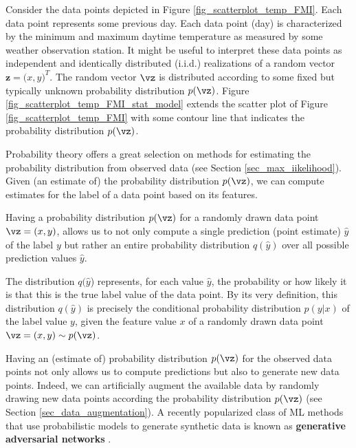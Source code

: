 \documentclass[12pt]{report}
\begin{document}
Consider the data points depicted in Figure \ref{fig_scatterplot_temp_FMI}. 
Each data point represents some previous day. Each data point (day) 
is characterized by the minimum and maximum daytime temperature 
as measured by some weather observation station. It might 
be useful to interpret these data points as independent and 
identically distributed (i.i.d.) realizations of a random vector 
$\mathbf{z} =\big(x,y\big)^{T}$. The random vector $\vz$ 
is distributed according to some fixed but typically unknown 
probability distribution $p(\vz)$. Figure \ref{fig_scatterplot_temp_FMI_stat_model} 
extends the scatter plot of Figure \ref{fig_scatterplot_temp_FMI} 
with some contour line that indicates the probability distribution $p(\vz)$. 

Probability theory offers a great selection on methods for 
estimating the probability distribution from observed data 
(see Section \ref{sec_max_iikelihood}). Given (an estimate of) 
the probability distribution $p(\vz)$, we can compute estimates 
for the label of a data point based on its features. 

Having a probability distribution $p(\vz)$ for a randomly 
drawn data point $\vz=(x,y)$, allows us to not only compute 
a single prediction (point estimate) $\hat{y}$ of the label $y$ 
but rather an entire probability distribution $q(\hat{y})$ over 
all possible prediction values $\hat{y}$. 

The distribution $q(\hat{y}$) represents, for each value $\hat{y}$, 
the probability or how likely it is that this is the true label value of 
the data point. By its very definition, this distribution $q(\hat{y})$ 
is precisely the conditional probability distribution $p(y|x)$ of the 
label value $y$, given the feature value $x$ of a randomly drawn 
data point $\vz=(x,y) \sim p(\vz)$. 

Having an (estimate of) probability distribution $p(\vz)$ for the observed 
data points not only allows us to compute predictions but also to generate 
new data points. Indeed, we can artificially augment the available data  
by randomly drawing new data points according the probability distribution $p(\vz)$ 
(see Section \ref{sec_data_augmentation}). A recently popularized class of 
ML methods that use probabilistic models to generate synthetic data  
is known as {\bf generative adversarial networks} \cite{GoodfellowGAN}. 
\end{document}
